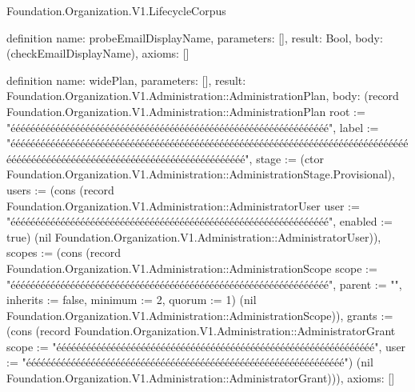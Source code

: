 \begin{lexlean}{Foundation.Organization.V1.LifecycleCorpus}
\begin{semanticmodule}
definition{
  name: probeEmailDisplayName,
  parameters: [],
  result: Bool,
  body: (checkEmailDisplayName),
  axioms: []
}

definition{
  name: widePlan,
  parameters: [],
  result: Foundation.Organization.V1.Administration::AdministrationPlan,
  body: (record Foundation.Organization.V1.Administration::AdministrationPlan {root := "éééééééééééééééééééééééééééééééééééééééééééééééééééééééééééééééé", label := "éééééééééééééééééééééééééééééééééééééééééééééééééééééééééééééééééééééééééééééééééééééééééééééééééééééééééééééééééééééééééééééééé", stage := (ctor Foundation.Organization.V1.Administration::AdministrationStage.Provisional), users := (cons (record Foundation.Organization.V1.Administration::AdministratorUser {user := "éééééééééééééééééééééééééééééééééééééééééééééééééééééééééééééééé", enabled := true}) (nil Foundation.Organization.V1.Administration::AdministratorUser)), scopes := (cons (record Foundation.Organization.V1.Administration::AdministrationScope {scope := "éééééééééééééééééééééééééééééééééééééééééééééééééééééééééééééééé", parent := "", inherits := false, minimum := 2, quorum := 1}) (nil Foundation.Organization.V1.Administration::AdministrationScope)), grants := (cons (record Foundation.Organization.V1.Administration::AdministratorGrant {scope := "éééééééééééééééééééééééééééééééééééééééééééééééééééééééééééééééé", user := "éééééééééééééééééééééééééééééééééééééééééééééééééééééééééééééééé"}) (nil Foundation.Organization.V1.Administration::AdministratorGrant))}),
  axioms: []
}


\end{semanticmodule}
\end{lexlean}

